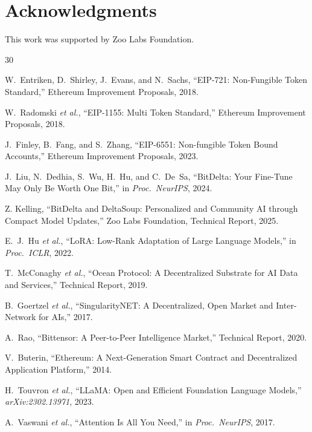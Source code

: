 \documentclass[11pt,letterpaper]{article}
\begin{document}
\section*{Acknowledgments}

This work was supported by Zoo Labs Foundation.


\begin{thebibliography}{30}

W.~Entriken, D.~Shirley, J.~Evans, and N.~Sachs, ``EIP-721: Non-Fungible Token Standard,'' Ethereum Improvement Proposals, 2018.

W.~Radomski \emph{et al.}, ``EIP-1155: Multi Token Standard,'' Ethereum Improvement Proposals, 2018.

J.~Finley, B.~Fang, and S.~Zhang, ``EIP-6551: Non-fungible Token Bound Accounts,'' Ethereum Improvement Proposals, 2023.

J.~Liu, N.~Dedhia, S.~Wu, H.~Hu, and C.~De~Sa, ``BitDelta: Your Fine-Tune May Only Be Worth One Bit,'' in \emph{Proc.\ NeurIPS}, 2024.

Z. Kelling, ``BitDelta and DeltaSoup: Personalized and Community AI through Compact Model Updates,'' Zoo Labs Foundation, Technical Report, 2025.

E.~J.~Hu \emph{et al.}, ``LoRA: Low-Rank Adaptation of Large Language Models,'' in \emph{Proc.\ ICLR}, 2022.

T.~McConaghy \emph{et al.}, ``Ocean Protocol: A Decentralized Substrate for AI Data and Services,'' Technical Report, 2019.

B.~Goertzel \emph{et al.}, ``SingularityNET: A Decentralized, Open Market and Inter-Network for AIs,'' 2017.

A.~Rao, ``Bittensor: A Peer-to-Peer Intelligence Market,'' Technical Report, 2020.

V.~Buterin, ``Ethereum: A Next-Generation Smart Contract and Decentralized Application Platform,'' 2014.

H.~Touvron \emph{et al.}, ``LLaMA: Open and Efficient Foundation Language Models,'' \emph{arXiv:2302.13971}, 2023.

A.~Vaswani \emph{et al.}, ``Attention Is All You Need,'' in \emph{Proc.\ NeurIPS}, 2017.


\end{thebibliography}
\end{document}
